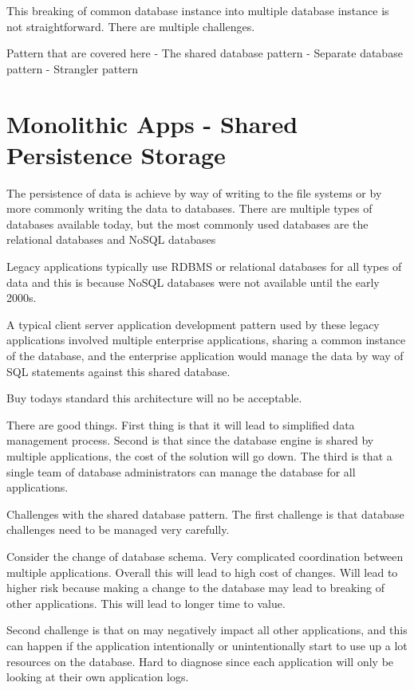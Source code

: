 \documentclass[a4paper, 11pt]{book}
\begin{document}
    This breaking of common database instance into multiple database instance is not straightforward.
    There are multiple challenges.

    Pattern that are covered here
    - The shared database pattern
    - Separate database pattern
    - Strangler pattern


    \section{Monolithic Apps - Shared Persistence Storage}
    The persistence of data is achieve by way of writing to the file systems or by more commonly writing the data to databases.
    There are multiple types of databases available today, but the most commonly used databases are the relational databases and NoSQL databases

    Legacy applications typically use RDBMS or relational databases for all types of data and this is because NoSQL databases were not available until the early 2000s.

    A typical client server application development pattern used by these legacy applications involved multiple enterprise applications, sharing a common instance of the database,
    and the enterprise application would manage the data by way of SQL statements against this shared database.

    Buy todays standard this architecture will no be acceptable.

    There are good things.
    First thing is that it will lead to simplified data management process.
    Second is that since the database engine is shared by multiple applications, the cost of the solution will go down.
    The third is that a single team of database administrators can manage the database for all applications.

    Challenges with the shared database pattern.
    The first challenge is that database challenges need to be managed very carefully.

    Consider the change of database schema.
    Very complicated coordination between multiple applications.
    Overall this will lead to high cost of changes.
    Will lead to higher risk because making a change to the database may lead to breaking of other applications.
    This will lead to longer time to value.

    Second challenge is that on may negatively impact all other applications, and this can happen if the application intentionally or unintentionally start to use up a lot resources on the database.
    Hard to diagnose since each application will only be looking at their own application logs.
\end{document}
